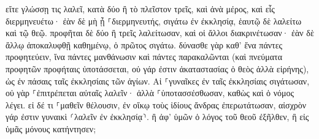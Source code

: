 \documentclass{openreader}
\begin{document}
εἴτε γλώσσῃ τις λαλεῖ, κατὰ δύο ἢ τὸ πλεῖστον τρεῖς, καὶ ἀνὰ μέρος, καὶ εἷς διερμηνευέτω· 
ἐὰν δὲ μὴ ᾖ ⸀διερμηνευτής, σιγάτω ἐν ἐκκλησίᾳ, ἑαυτῷ δὲ λαλείτω καὶ τῷ θεῷ. 
προφῆται δὲ δύο ἢ τρεῖς λαλείτωσαν, καὶ οἱ ἄλλοι διακρινέτωσαν· 
ἐὰν δὲ ἄλλῳ ἀποκαλυφθῇ καθημένῳ, ὁ πρῶτος σιγάτω. 
δύνασθε γὰρ καθ’ ἕνα πάντες προφητεύειν, ἵνα πάντες μανθάνωσιν καὶ πάντες παρακαλῶνται 
(καὶ πνεύματα προφητῶν προφήταις ὑποτάσσεται, 
οὐ γάρ ἐστιν ἀκαταστασίας ὁ θεὸς ἀλλὰ εἰρήνης), ὡς ἐν πάσαις ταῖς ἐκκλησίαις τῶν ἁγίων. 
Αἱ ⸀γυναῖκες ἐν ταῖς ἐκκλησίαις σιγάτωσαν, οὐ γὰρ ⸀ἐπιτρέπεται αὐταῖς λαλεῖν· ἀλλὰ ⸀ὑποτασσέσθωσαν, καθὼς καὶ ὁ νόμος λέγει. 
εἰ δέ τι ⸀μαθεῖν θέλουσιν, ἐν οἴκῳ τοὺς ἰδίους ἄνδρας ἐπερωτάτωσαν, αἰσχρὸν γάρ ἐστιν γυναικὶ ⸂λαλεῖν ἐν ἐκκλησίᾳ⸃. 
ἢ ἀφ’ ὑμῶν ὁ λόγος τοῦ θεοῦ ἐξῆλθεν, ἢ εἰς ὑμᾶς μόνους κατήντησεν; 
\end{document}
